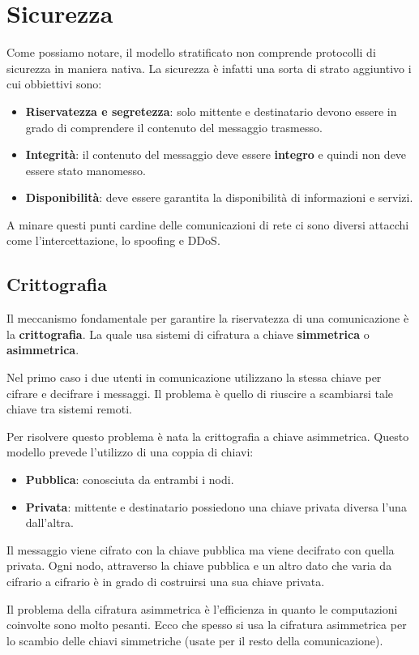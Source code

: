 \chapter{Sicurezza}
Come possiamo notare, il modello stratificato non comprende protocolli
di sicurezza in maniera nativa. La sicurezza è infatti una sorta di 
strato aggiuntivo i cui obbiettivi sono:
\begin{itemize}
	\item \textbf{Riservatezza e segretezza}: solo mittente e 
		destinatario devono essere in grado di comprendere il contenuto
		del messaggio trasmesso.
	\item \textbf{Integrità}: il contenuto del messaggio deve essere
		\textbf{integro} e quindi non deve essere stato manomesso.
	\item \textbf{Disponibilità}: deve essere garantita la 
		disponibilità di informazioni e servizi.
\end{itemize}
A minare questi punti cardine delle comunicazioni di rete ci sono 
diversi attacchi come l'intercettazione, lo spoofing e DDoS.

\section{Crittografia}
Il meccanismo fondamentale per garantire la riservatezza di una
comunicazione è la \textbf{crittografia}. La quale usa sistemi di
cifratura a chiave \textbf{simmetrica} o \textbf{asimmetrica}.

Nel primo caso i due utenti in comunicazione utilizzano la stessa 
chiave per cifrare e decifrare i messaggi. Il problema è quello di 
riuscire a scambiarsi tale chiave tra sistemi remoti.

Per risolvere questo problema è nata la crittografia a chiave 
asimmetrica. Questo modello prevede l'utilizzo di una coppia di chiavi:
\begin{itemize}
	\item \textbf{Pubblica}: conosciuta da entrambi i nodi.
	\item \textbf{Privata}: mittente e destinatario possiedono una
		chiave privata diversa l'una dall'altra.
\end{itemize}
Il messaggio viene cifrato con la chiave pubblica ma viene decifrato
con quella privata. Ogni nodo, attraverso la chiave pubblica e un 
altro dato che varia da cifrario a cifrario è in grado di costruirsi
una sua chiave privata.

Il problema della cifratura asimmetrica è l'efficienza in quanto le 
computazioni coinvolte sono molto pesanti. Ecco che spesso si usa la
cifratura asimmetrica per lo scambio delle chiavi simmetriche (usate
per il resto della comunicazione).

